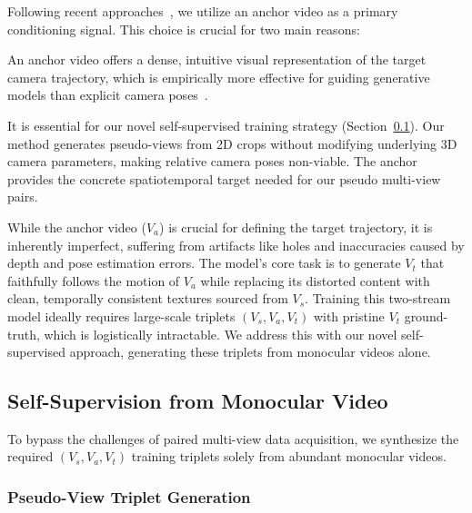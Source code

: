 Following recent approaches~\cite{yu2025trajectorycrafter,ex4d,jeong2025reangle,bai2024syncammaster,wang2025epic}, we utilize an anchor video as a primary conditioning signal. This choice is crucial for two main reasons:
\begin{description}[noitemsep, topsep=0pt, partopsep=0pt, leftmargin=0pt, style=unboxed, font=\normalfont\bfseries]
    \item [Intuitive Visual Guidance:] An anchor video offers a dense, intuitive visual representation of the target camera trajectory, which is empirically more effective for guiding generative models than explicit camera poses~\cite{wang2025epic}.
    \item [Self-Supervised Training Necessity:] It is essential for our novel self-supervised training strategy (Section~\ref{sec:self_supervision}). Our method generates pseudo-views from 2D crops without modifying underlying 3D camera parameters, making relative camera poses non-viable. The anchor provides the concrete spatiotemporal target needed for our pseudo multi-view pairs.
\end{description}

While the anchor video ($V_a$) is crucial for defining the target trajectory, it is inherently imperfect, suffering from artifacts like holes and inaccuracies caused by depth and pose estimation errors. The model's core task is to generate $V_{t}$ that faithfully follows the motion of $V_{a}$ while replacing its distorted content with clean, temporally consistent textures sourced from $V_{s}$. Training this two-stream model ideally requires large-scale triplets $(V_{s}, V_{a}, V_{t})$ with pristine $V_t$ ground-truth, which is logistically intractable. We address this with our novel self-supervised approach, generating these triplets from monocular videos alone.



\subsection{Self-Supervision from Monocular Video}
\label{sec:self_supervision}

To bypass the challenges of paired multi-view data acquisition, we synthesize the required $(V_s, V_a, V_t)$ training triplets solely from abundant monocular videos.

\subsubsection{Pseudo-View Triplet Generation}
\label{sec:pseudo_view_triplet}

